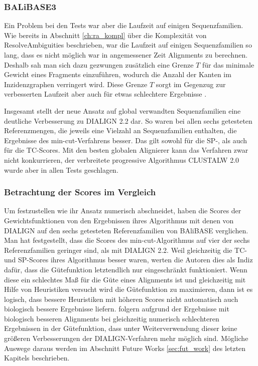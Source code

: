 \subsubsection{BALiBASE3}

Ein Problem bei den Tests war aber die Laufzeit auf einigen Sequenzfamilien. Wie bereits in Abschnitt \ref{ch:ra_kompl} über die Komplexität von \textrm{ResolveAmbiguities} beschrieben, war die Laufzeit auf einigen Sequenzfamilien so lang, dass es nicht möglich war in angemessener Zeit Alignments zu berechnen. Deshalb sah man sich dazu gezwungen zusätzlich eine Grenze $T$ für das minimale Gewicht eines Fragments einzuführen, wodurch die Anzahl der Kanten im Inzidenzgraphen verringert wird. Diese Grenze $T$ sorgt im Gegenzug zur verbesserten Laufzeit aber auch für etwas schlechtere Ergebnisse \cite{cpm10}.

Insgesamt stellt der neue Ansatz auf global verwandten Sequenzfamilien eine deutliche Verbesserung zu DIALIGN 2.2 dar. So waren bei allen sechs getesteten Referenzmengen, die jeweils eine Vielzahl an Sequenzfamilien enthalten, die Ergebnisse des min-cut-Verfahrens besser. Das gilt sowohl für die SP-, als auch für die TC-Scores. Mit den besten globalen Alignierer kann das Verfahren zwar nicht konkurrieren, der verbreitete progressive Algorithmus CLUSTALW 2.0 wurde aber in allen Tests geschlagen. 

\subsubsection{Betrachtung der Scores im Vergleich}

Um festzustellen wie ihr Ansatz numerisch abschneidet, haben \cite{cpm10} die Scores der Gewichtsfunktionen von den Ergebnissen ihres Algorithmus mit denen von DIALIGN auf den sechs getesteten Referenzfamilien von BAliBASE verglichen. Man hat festgestellt, dass die Scores des min-cut-Algorithmus auf vier der sechs Referenzfamilien geringer sind, als mit DIALIGN 2.2. Weil gleichzeitig die TC- und SP-Scores ihres Algorithmus besser waren, werten die Autoren dies als Indiz dafür, dass die Gütefunktion letztendlich nur eingeschränkt funktioniert. Wenn diese ein schlechtes Maß für die Güte eines Alignments ist und gleichzeitig mit Hilfe von Heuristiken versucht wird die Gütefunktion zu maximieren, dann ist es logisch, dass bessere Heuristiken mit höheren Scores nicht automatisch auch biologisch bessere Ergebnisse liefern. \cite{cpm10} folgern aufgrund der Ergebnisse mit biologisch besseren Alignments bei gleichzeitig numerisch schlechteren Ergebnissen in der Gütefunktion, dass unter Weiterverwendung dieser keine größeren Verbesserungen der DIALIGN-Verfahren mehr möglich sind. Mögliche Auswege daraus werden im Abschnitt Future Works \ref{sec:fut_work} des letzten Kapitels beschrieben.

